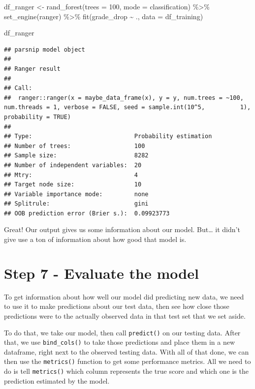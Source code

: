 \documentclass[
]{book}
\newenvironment{Shaded}{\begin{snugshade}}{\end{snugshade}}
\newcommand{\AttributeTok}[1]{\textcolor[rgb]{0.77,0.63,0.00}{#1}}
\newcommand{\DecValTok}[1]{\textcolor[rgb]{0.00,0.00,0.81}{#1}}
\newcommand{\FunctionTok}[1]{\textcolor[rgb]{0.00,0.00,0.00}{#1}}
\newcommand{\NormalTok}[1]{#1}
\newcommand{\OtherTok}[1]{\textcolor[rgb]{0.56,0.35,0.01}{#1}}
\newcommand{\SpecialCharTok}[1]{\textcolor[rgb]{0.00,0.00,0.00}{#1}}
\newcommand{\StringTok}[1]{\textcolor[rgb]{0.31,0.60,0.02}{#1}}
\begin{document}
\begin{Shaded}
\begin{Highlighting}[]
\NormalTok{df\_ranger }\OtherTok{\textless{}{-}} \FunctionTok{rand\_forest}\NormalTok{(}\AttributeTok{trees =} \DecValTok{100}\NormalTok{, }\AttributeTok{mode =} \StringTok{\textquotesingle{}classification\textquotesingle{}}\NormalTok{) }\SpecialCharTok{\%\textgreater{}\%}
  \FunctionTok{set\_engine}\NormalTok{(}\StringTok{\textquotesingle{}ranger\textquotesingle{}}\NormalTok{) }\SpecialCharTok{\%\textgreater{}\%}
  \FunctionTok{fit}\NormalTok{(grade\_drop }\SpecialCharTok{\textasciitilde{}}\NormalTok{ ., }\AttributeTok{data =}\NormalTok{ df\_training)}

\NormalTok{df\_ranger}
\end{Highlighting}
\end{Shaded}

\begin{verbatim}
## parsnip model object
## 
## Ranger result
## 
## Call:
##  ranger::ranger(x = maybe_data_frame(x), y = y, num.trees = ~100,      num.threads = 1, verbose = FALSE, seed = sample.int(10^5,          1), probability = TRUE) 
## 
## Type:                             Probability estimation 
## Number of trees:                  100 
## Sample size:                      8282 
## Number of independent variables:  20 
## Mtry:                             4 
## Target node size:                 10 
## Variable importance mode:         none 
## Splitrule:                        gini 
## OOB prediction error (Brier s.):  0.09923773
\end{verbatim}

Great! Our output gives us some information about our model. But\ldots{} it didn't give use a ton of information about how good that model is.

\hypertarget{step-7---evaluate-the-model}{%
\section{Step 7 - Evaluate the model}\label{step-7---evaluate-the-model}}

To get information about how well our model did predicting new data, we need to use it to make predictions about our test data, then see how close those predictions were to the actually observed data in that test set that we set aside.

To do that, we take our model, then call \texttt{predict()} on our testing data. After that, we use \texttt{bind\_cols()} to take those predictions and place them in a new dataframe, right next to the observed testing data. With all of that done, we can then use the \texttt{metrics()} function to get some performance metrics. All we need to do is tell \texttt{metrics()} which column represents the true score and which one is the prediction estimated by the model.
\end{document}
